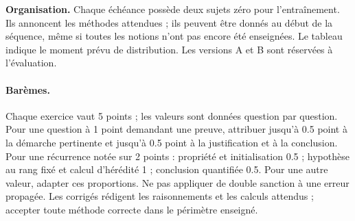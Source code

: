 \textbf{Organisation.} Chaque échéance possède deux sujets zéro pour l'entraînement. Ils annoncent les méthodes attendues ; ils peuvent être donnés au début de la séquence, même si toutes les notions n'ont pas encore été enseignées. Le tableau indique le moment prévu de distribution. Les versions A et B sont réservées à l'évaluation.
\ifmxteacher
\paragraph{Barèmes.} Chaque exercice vaut 5 points ; les valeurs sont données question par question. Pour une question à 1 point demandant une preuve, attribuer jusqu'à \num{0,5} point à la démarche pertinente et jusqu'à \num{0,5} point à la justification et à la conclusion. Pour une récurrence notée sur 2 points : propriété et initialisation \num{0,5} ; hypothèse au rang fixé et calcul d'hérédité 1 ; conclusion quantifiée \num{0,5}. Pour une autre valeur, adapter ces proportions. Ne pas appliquer de double sanction à une erreur propagée. Les corrigés rédigent les raisonnements et les calculs attendus ; accepter toute méthode correcte dans le périmètre enseigné.
